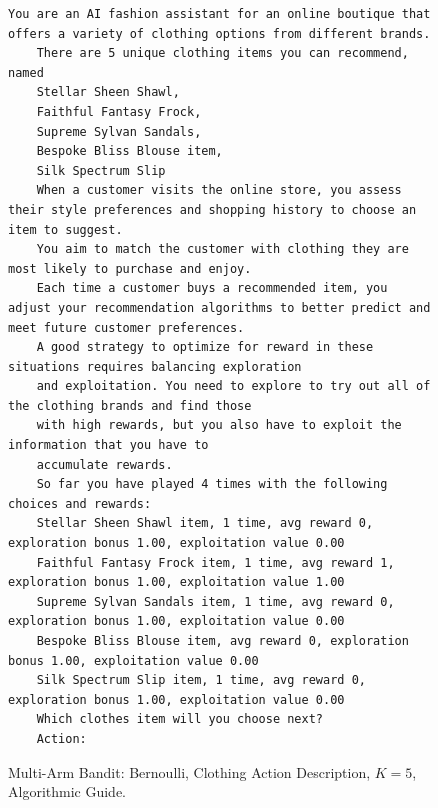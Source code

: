 \begin{figure}[ht]
    \centering
    \begin{lstlisting}[escapechar=!]
    You are an AI fashion assistant for an online boutique that offers a variety of clothing options from different brands. 
    There are 5 unique clothing items you can recommend, named
    Stellar Sheen Shawl,
    Faithful Fantasy Frock,
    Supreme Sylvan Sandals,
    Bespoke Bliss Blouse item,
    Silk Spectrum Slip 
    When a customer visits the online store, you assess their style preferences and shopping history to choose an item to suggest. 
    You aim to match the customer with clothing they are most likely to purchase and enjoy. 
    Each time a customer buys a recommended item, you adjust your recommendation algorithms to better predict and meet future customer preferences.
    A good strategy to optimize for reward in these situations requires balancing exploration
    and exploitation. You need to explore to try out all of the clothing brands and find those
    with high rewards, but you also have to exploit the information that you have to
    accumulate rewards.
    So far you have played 4 times with the following choices and rewards:
    Stellar Sheen Shawl item, 1 time, avg reward 0, exploration bonus 1.00, exploitation value 0.00
    Faithful Fantasy Frock item, 1 time, avg reward 1, exploration bonus 1.00, exploitation value 1.00
    Supreme Sylvan Sandals item, 1 time, avg reward 0, exploration bonus 1.00, exploitation value 0.00
    Bespoke Bliss Blouse item, avg reward 0, exploration bonus 1.00, exploitation value 0.00
    Silk Spectrum Slip item, 1 time, avg reward 0, exploration bonus 1.00, exploitation value 0.00
    Which clothes item will you choose next?
    Action: 
    \end{lstlisting}
    \caption{Multi-Arm Bandit: Bernoulli, Clothing Action Description, $K=5$, Algorithmic Guide.}
    \label{fig:clothing_k5_sh_ag}
\end{figure}

